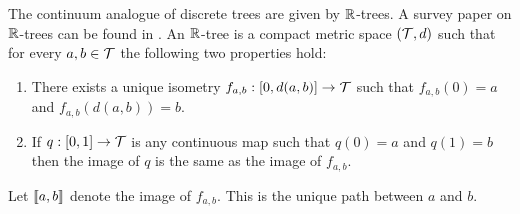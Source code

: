 The continuum analogue of discrete trees are given by ${\mathbb R}$-trees. A survey paper on ${\mathbb R}$-trees can be found in . An ${\mathbb R}$-tree is a compact metric space $({\mathcal T}, d)$ such that for every $a, b \in {\mathcal T}$ the following two properties hold:
\begin{enumerate}
    \item There exists a unique isometry $f_{a, b} : [0, d(a, b)] \to {\mathcal T}$ such that $f_{a, b}(0) = a$ and $f_{a, b}(d(a, b)) = b$.
    \item If $q: [0, 1] \to {\mathcal T}$ is any continuous map such that $q(0) = a$ and $q(1) = b$ then the image of $q$ is the same as the image of $f_{a, b}$.
\end{enumerate}
Let $\llbracket a, b\rrbracket$ denote the image of $f_{a, b}$. This is the unique path between $a$ and $b$.